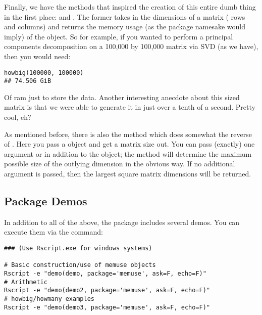 Finally, we have the methods that inspired the creation of this entire dumb thing in the first place:   and .  The former takes in the dimensions of a matrix ( rows and  columns) and returns the memory usage (as the package namesake would imply) of the object.  So for example, if you wanted to perform a principal components decomposition on a 100,000 by 100,000 matrix via SVD (as we have), then you would need:
\begin{lstlisting}
howbig(100000, 100000)
## 74.506 GiB
\end{lstlisting}
Of ram just to store the data.  Another interesting anecdote about this sized matrix is that we were able to generate it in just over a tenth of a second.  Pretty cool, eh?

As mentioned before, there is also the  method which does somewhat the reverse of .  Here you pass a  object and get a matrix size out.  You can pass (exactly) one argument  or  in addition to the  object; the method will determine the maximum possible size of the outlying dimension in the obvious way.  If no additional argument is passed, then the largest square matrix dimensions will be returned.



\subsection{Package Demos}

In addition to all of the above, the  package includes several demos.  You can execute them via the command:
\begin{lstlisting}[title=List of Demos]
### (Use Rscript.exe for windows systems)

# Basic construction/use of memuse objects
Rscript -e "demo(demo, package='memuse', ask=F, echo=F)"
# Arithmetic
Rscript -e "demo(demo2, package='memuse', ask=F, echo=F)"
# howbig/howmany examples
Rscript -e "demo(demo3, package='memuse', ask=F, echo=F)"
\end{lstlisting}
